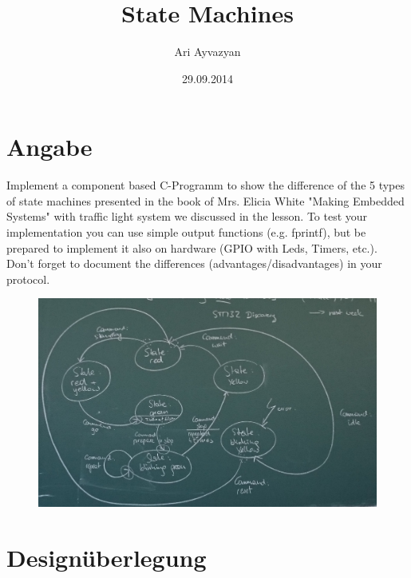 \documentclass[12pt,a4paper,draft]{report}
\date{29.09.2014}
\author{Ari Ayvazyan}
\title{State Machines}
\begin{document}
\maketitle

\tableofcontents

\chapter{Angabe}
Implement a component based C-Programm to show the difference of the 5 types of state machines presented in the book of Mrs. Elicia White "Making Embedded Systems" with traffic light system we discussed in the lesson. To test your implementation you can use simple output functions (e.g. fprintf), but be prepared to implement it also on hardware (GPIO with Leds, Timers, etc.).
\newline
Don't forget to document the differences (advantages/disadvantages) in your protocol.

\begin{figure}[h]
\centering
\includegraphics[width=1\linewidth]{angabeTafel.png}
\label{fig:angabeTafel}
\end{figure}

\chapter{Designüberlegung}
\end{document}

